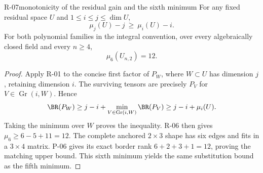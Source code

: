 \begin{finding}{R-07}{monotonicity of the residual gain and the sixth minimum}
For any fixed residual space $U$ and
$1\leq i\leq j\leq\dim U$,
\[
 \mu_j(U)-j\ \geq\ \mu_i(U)-i.
\]
For both polynomial families in the integral convention,
over every algebraically closed field and every $n\geq4$,
\[
 \mu_6(U_{n,2})=12.
\]
\end{finding}
\begin{proof}
Apply R-01 to the concise first factor of $P_W$, where
$W\subset U$ has dimension $j$, retaining dimension $i$.
The surviving tensors are precisely $P_V$ for
$V\in\operatorname{Gr}(i,W)$. Hence
\[
 \BR(P_W)\geq j-i+
 \min_{V\in\operatorname{Gr}(i,W)}\BR(P_V)
 \geq j-i+\mu_i(U).
\]
Taking the minimum over $W$ proves the inequality.
R-06 then gives $\mu_6\geq6-5+11=12$.
The complete anchored $2\times3$ shape has six edges
and fits in a $3\times4$ matrix. P-06 gives its exact
border rank $6+2+3+1=12$, proving the matching upper
bound. This sixth minimum yields the same substitution
bound as the fifth minimum.
\end{proof}
